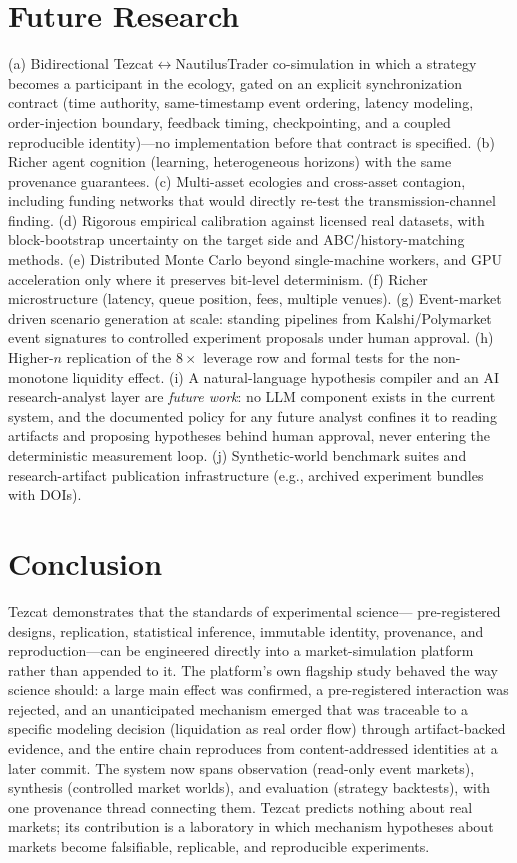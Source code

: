 \documentclass[conference]{IEEEtran}
\newcommand{\tez}{Tezcat}
\begin{document}
\section{Future Research}
\label{sec:future}
(a) Bidirectional \tez{}$\leftrightarrow$NautilusTrader co-simulation
in which a strategy becomes a participant in the ecology, gated on an
explicit synchronization contract (time authority, same-timestamp
event ordering, latency modeling, order-injection boundary, feedback
timing, checkpointing, and a coupled reproducible identity)---no
implementation before that contract is specified. (b) Richer agent
cognition (learning, heterogeneous horizons) with the same provenance
guarantees. (c) Multi-asset ecologies and cross-asset contagion,
including funding networks that would directly re-test the
transmission-channel finding. (d) Rigorous empirical calibration
against licensed real datasets, with block-bootstrap uncertainty on
the target side and ABC/history-matching methods. (e) Distributed
Monte Carlo beyond single-machine workers, and GPU acceleration only
where it preserves bit-level determinism. (f) Richer microstructure
(latency, queue position, fees, multiple venues). (g) Event-market
driven scenario generation at scale: standing pipelines from
Kalshi/Polymarket event signatures to controlled experiment proposals
under human approval. (h) Higher-$n$ replication of the $8\times$
leverage row and formal tests for the non-monotone liquidity effect.
(i) A natural-language hypothesis compiler and an AI research-analyst
layer are \emph{future work}: no LLM component exists in the current
system, and the documented policy for any future analyst confines it
to reading artifacts and proposing hypotheses behind human approval,
never entering the deterministic measurement loop. (j) Synthetic-world
benchmark suites and research-artifact publication infrastructure
(e.g., archived experiment bundles with DOIs).

\section{Conclusion}
\label{sec:conclusion}
\tez{} demonstrates that the standards of experimental science---
pre-registered designs, replication, statistical inference, immutable
identity, provenance, and reproduction---can be engineered directly
into a market-simulation platform rather than appended to it. The
platform's own flagship study behaved the way science should: a large
main effect was confirmed, a pre-registered interaction was rejected,
and an unanticipated mechanism emerged that was traceable to a specific
modeling decision (liquidation as real order flow) through
artifact-backed evidence, and the entire chain reproduces from
content-addressed identities at a later commit. The system now spans
observation (read-only event markets), synthesis (controlled market
worlds), and evaluation (strategy backtests), with one provenance
thread connecting them. \tez{} predicts nothing about real markets;
its contribution is a laboratory in which mechanism hypotheses about
markets become falsifiable, replicable, and reproducible experiments.
\end{document}
